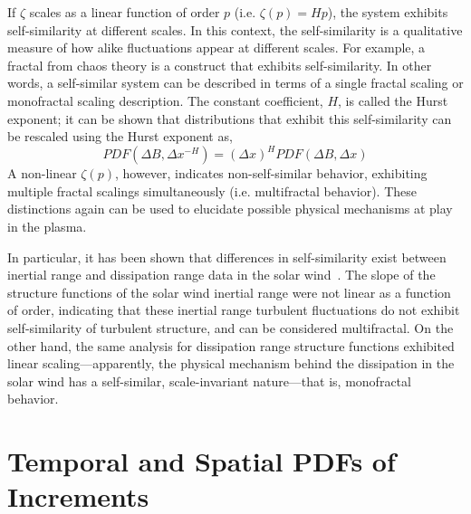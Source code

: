 \documentclass[preprint2]{aastex}
\begin{document}
If $\zeta$ scales as a linear function of order $p$ (i.e. $\zeta(p) = Hp$), the system exhibits self-similarity at different scales. In this context, the self-similarity is a qualitative measure of how alike fluctuations appear at different scales. For example, a fractal from chaos theory is a construct that exhibits self-similarity. In other words, a self-similar system can be described in terms of a single fractal scaling or monofractal scaling description. The constant coefficient, $H$, is called the Hurst exponent; it can be shown that distributions that exhibit this self-similarity can be rescaled using the Hurst exponent as,
\begin{equation}
PDF(\Delta B,\Delta x^{-H}) = (\Delta x)^HPDF(\Delta B,\Delta x)
\label{eq:scaling}
\end{equation}
A non-linear $\zeta(p)$, however, indicates non-self-similar behavior, exhibiting multiple fractal scalings simultaneously (i.e. multifractal behavior). These distinctions again can be used to elucidate possible physical mechanisms at play in the plasma. 

In particular, it has been shown that differences in self-similarity exist between inertial range and dissipation range data in the solar wind~\citep{kiyani2009,kiyani2013}. The slope of the structure functions of the solar wind inertial range were not linear as a function of order, indicating that these inertial range turbulent fluctuations do not exhibit self-similarity of turbulent structure, and can be considered multifractal. On the other hand, the same analysis for dissipation range structure functions exhibited linear scaling---apparently, the physical mechanism behind the dissipation in the solar wind has a self-similar, scale-invariant nature---that is, monofractal behavior.

\section{Temporal and Spatial PDFs of Increments}\label{sec:pdfs}
\end{document}
